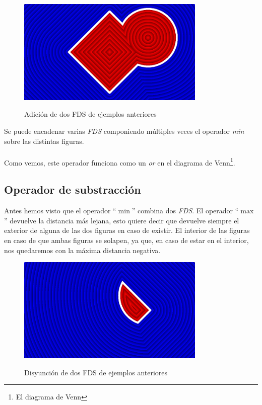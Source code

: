\begin{figure}[H]
  \centering
  \captionsetup{justification=centering}%
  \includegraphics[width=0.8\textwidth]{secciones/imagenes/sdf/2d/sdf_add.png}\label{fig:add}
  \caption{ Adición de dos FDS de ejemplos anteriores}
\end{figure}
Se puede encadenar varias \textit{FDS} componiendo múltiples veces el operador \textit{min} sobre las distintas figuras. \\\\
Como vemos, este operador funciona como un \textit{or} en el diagrama de Venn\footnote{El diagrama de Venn}.

\subsection{Operador de substracción}
Antes hemos visto que el operador \enquote{\(\min\)} combina dos \textit{FDS}. El operador \enquote{\(\max\)} devuelve la distancia más lejana, esto quiere decir que devuelve siempre el exterior de alguna de las dos figuras en caso de existir. El interior de las figuras en caso de que ambas figuras se solapen, ya que, en caso de estar en el interior, nos quedaremos con la máxima distancia negativa.

\begin{figure}[H]
  \centering
  \captionsetup{justification=centering}%
  \includegraphics[width=0.8\textwidth]{secciones/imagenes/sdf/2d/sdf_subtract-1.png}\label{fig:disyunccion}
  \caption{ Disyunción de dos FDS de ejemplos anteriores}
\end{figure}

